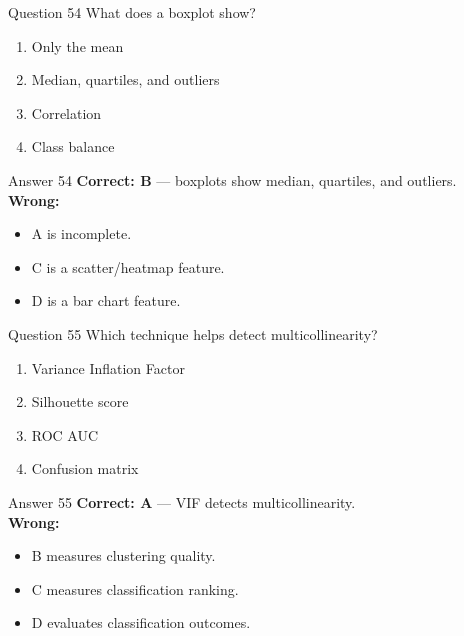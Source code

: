 \documentclass[aspectratio=169,11pt]{beamer}
\begin{document}
	\begin{frame}{Question 54}
		What does a boxplot show?
		\begin{enumerate}[label=\Alph*.]
			\item Only the mean
			\item Median, quartiles, and outliers
			\item Correlation
			\item Class balance
		\end{enumerate}
	\end{frame}
	\begin{frame}{Answer 54}
		\textbf{Correct: B} --- boxplots show median, quartiles, and outliers.\\
		\vspace{0.5em}
		\textbf{Wrong:}
		\begin{itemize}
			\item A is incomplete.
			\item C is a scatter/heatmap feature.
			\item D is a bar chart feature.
		\end{itemize}
	\end{frame}
	
	\begin{frame}{Question 55}
		Which technique helps detect multicollinearity?
		\begin{enumerate}[label=\Alph*.]
			\item Variance Inflation Factor
			\item Silhouette score
			\item ROC AUC
			\item Confusion matrix
		\end{enumerate}
	\end{frame}
	\begin{frame}{Answer 55}
		\textbf{Correct: A} --- VIF detects multicollinearity.\\
		\vspace{0.5em}
		\textbf{Wrong:}
		\begin{itemize}
			\item B measures clustering quality.
			\item C measures classification ranking.
			\item D evaluates classification outcomes.
		\end{itemize}
	\end{frame}
	
\end{document}
